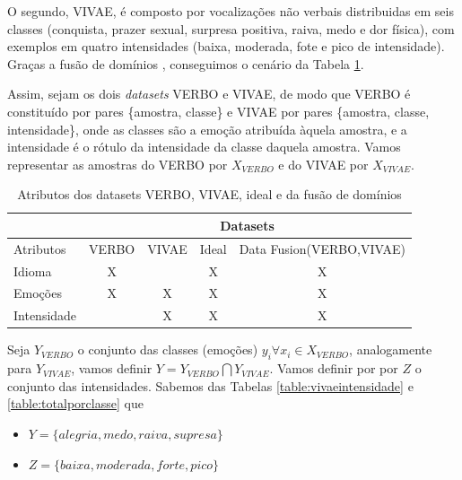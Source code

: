 O segundo, VIVAE, é composto por vocalizações não verbais distribuidas em seis classes (conquista, prazer sexual, surpresa positiva, raiva, medo e dor física), com exemplos em quatro intensidades (baixa, moderada, fote e pico de intensidade). Graças a fusão de domínios \cite{49}, conseguimos o cenário da Tabela \ref{table:datasetideal}.

Assim, sejam os dois \textit{datasets} VERBO e VIVAE, de modo que VERBO é constituído por pares \{amostra, classe\} e VIVAE por pares \{amostra, classe, intensidade\}, onde as classes são a emoção atribuída àquela amostra, e a intensidade é o rótulo da intensidade da classe daquela amostra. Vamos representar as amostras do VERBO por $X_{VERBO}$ e do VIVAE por $X_{VIVAE}$.

\begin{table}[!h]
\centering
\caption{Atributos dos datasets VERBO, VIVAE, ideal e da fusão de domínios}
\begin{tabular}{l|cccc|}
\cline{2-5}
 & \multicolumn{4}{c|}{Datasets} \\ \hline
\multicolumn{1}{|l|}{Atributos} & \multicolumn{1}{c|}{VERBO} & \multicolumn{1}{c|}{VIVAE} & \multicolumn{1}{c|}{Ideal} & Data Fusion(VERBO,VIVAE) \\ \hline
\multicolumn{1}{|l|}{Idioma} & \multicolumn{1}{c|}{X} & \multicolumn{1}{c|}{} & \multicolumn{1}{c|}{X} & X \\ \hline
\multicolumn{1}{|l|}{Emoções} & \multicolumn{1}{c|}{X} & \multicolumn{1}{c|}{X} & \multicolumn{1}{c|}{X} & X \\ \hline
\multicolumn{1}{|l|}{Intensidade} & \multicolumn{1}{c|}{} & \multicolumn{1}{c|}{X} & \multicolumn{1}{c|}{X} & X \\ \hline
\end{tabular}\label{table:datasetideal}
\end{table}

Seja $Y_{VERBO}$ o conjunto das classes (emoções) $y_i \forall x_i \in X_{VERBO}$, analogamente para $Y_{VIVAE}$, vamos definir $Y = Y_{VERBO} \bigcap Y_{VIVAE}$. Vamos definir por por $Z$ o conjunto das intensidades. Sabemos das Tabelas \ref{table:vivaeintensidade} e \ref{table:totalporclasse} que

\begin{itemize}
    \item $Y = \{alegria, medo, raiva, supresa\}$
    \item $Z = \{baixa, moderada, forte, pico\}$
\end{itemize}

